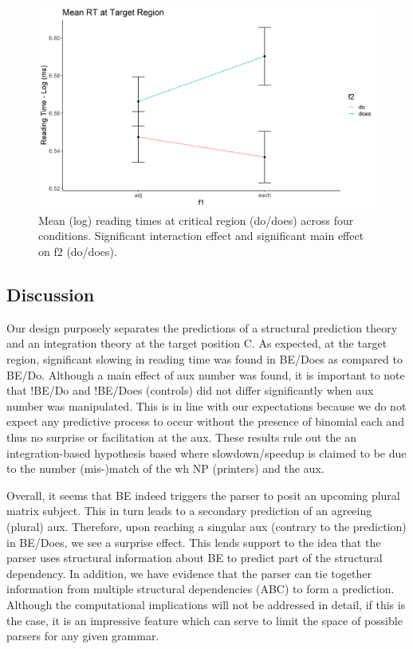 \documentclass[12pt]{article}
\begin{document}
\begin{figure}[h!]
    \center
    \includegraphics[scale=0.50]{howmanytarget.png}
    \caption{Mean (log) reading times at critical region (do/does) across
        four conditions. Significant interaction effect and significant
        main effect on f2 (do/does).}
    \label{fig:howmanytarget}
\end{figure}

\subsection{Discussion}
Our design purposely separates the predictions of a structural prediction theory and an integration theory at the target position C. As expected, at the target region, significant slowing in reading time was found in BE/Does as compared to BE/Do. Although a main effect of aux number was found, it is important to note that !BE/Do and !BE/Does
(controls) did not differ significantly when aux number was manipulated. This is in line with our expectations because we do not expect any predictive process to occur without the presence of binomial each and thus no surprise or facilitation at the aux. These results rule out the an integration-based hypothesis based where slowdown/speedup is claimed to be due to the number (mis-)match of the wh NP (printers) and the aux.

Overall, it seems that BE indeed triggers the parser to posit an upcoming plural matrix subject. This in turn leads to a secondary prediction of an agreeing (plural) aux. Therefore, upon reaching a singular aux (contrary to the prediction) in BE/Does, we see a surprise effect. This lends support to the idea that the parser uses structural information about BE to predict part of the structural dependency. In addition, we have evidence that the parser can tie together information from multiple structural dependencies (ABC) to form a prediction. Although the computational implications will not be addressed in detail, if this is the case, it is an impressive feature which can serve to limit the space of possible parsers for any given grammar.
\end{document}
